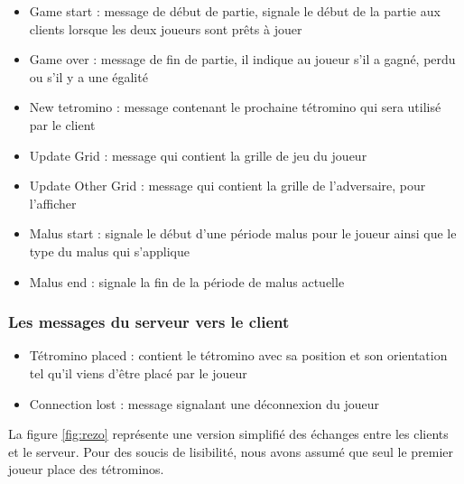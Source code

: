 \documentclass[a4paper, 12pt]{article}
\begin{document}
				\begin{itemize}
					\item Game start : message de début de partie, signale le début de la partie aux clients lorsque les deux joueurs sont prêts à jouer
					\item Game over : message de fin de partie, il indique au joueur s'il a gagné, perdu ou s'il y a une égalité
					\item New tetromino : message contenant le prochaine tétromino qui sera utilisé par le client
					\item Update Grid : message qui contient la grille de jeu du joueur
					\item Update Other Grid : message qui contient la grille de l'adversaire, pour l'afficher
					\item Malus start : signale le début d'une période malus pour le joueur ainsi que le type du malus qui s'applique
					\item Malus end : signale la fin de la période de malus actuelle
				\end{itemize}

			\subsubsection{Les messages du serveur vers le client}

				\begin{itemize}
					\item Tétromino placed : contient le tétromino avec sa position et son orientation tel qu'il viens d'être placé par le joueur
					\item Connection lost : message signalant une déconnexion du joueur
				\end{itemize}

				La figure \ref{fig:rezo} représente une version simplifié des échanges entre les clients et le serveur. Pour des soucis de lisibilité, nous avons assumé que seul le premier joueur place des tétrominos.
\end{document}
